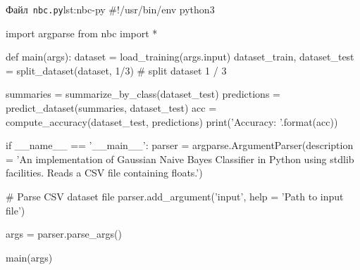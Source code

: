 \documentclass[
	a4paper,
	oneside,
	DIV = 12,
	fontsize = 13pt,
	headings = normal,
	numbers = endperiod,
	bibliography = totoc, %
]{scrartcl}
\theoremstyle{mythm}
\newcommand{\filename}[1]{\texttt{#1}}
\begin{document}
		\begin{listingpython}[toprule = 0pt, bottomrule = 0pt]{Файл~\filename{nbc.py}}{lst:nbc-py}
#!/usr/bin/env python3

import argparse
from nbc import *

def main(args):
    dataset = load_training(args.input)
    dataset_train, dataset_test = split_dataset(dataset, 1/3) # split dataset 1 / 3

    summaries = summarize_by_class(dataset_test)
    predictions = predict_dataset(summaries, dataset_test)
    acc = compute_accuracy(dataset_test, predictions)
    print('Accuracy: {}'.format(acc))

if __name__ == '__main__':
    parser = argparse.ArgumentParser(description = 'An implementation of Gaussian Naive Bayes Classifier in Python using stdlib facilities. Reads a CSV file containing floats.')

    # Parse CSV dataset file
    parser.add_argument('input', help = 'Path to input file')
    
    args = parser.parse_args()

    main(args)
		\end{listingpython}
\end{document}
